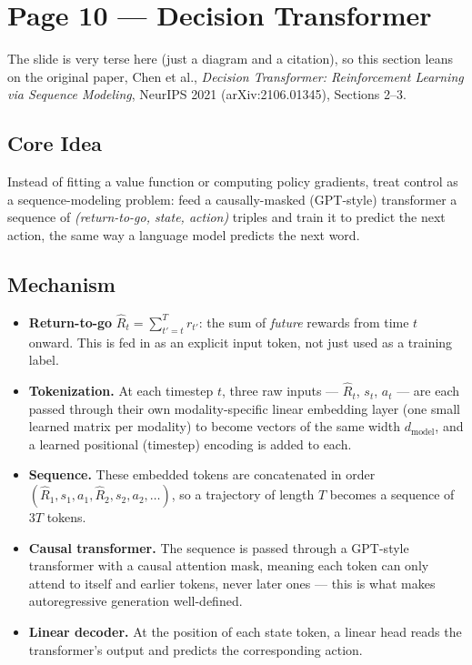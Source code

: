 \documentclass[11pt]{article}
\begin{document}
\section*{Page 10 --- Decision Transformer}

The slide is very terse here (just a diagram and a citation), so this section leans on the original paper, Chen et al., \emph{Decision Transformer: Reinforcement Learning via Sequence Modeling}, NeurIPS 2021 (arXiv:2106.01345), Sections 2--3.

\subsection*{Core Idea}

Instead of fitting a value function or computing policy gradients, treat control as a sequence-modeling problem: feed a causally-masked (GPT-style) transformer a sequence of \emph{(return-to-go, state, action)} triples and train it to predict the next action, the same way a language model predicts the next word.

\subsection*{Mechanism}

\begin{itemize}
\item \textbf{Return-to-go} $\hat R_t = \sum_{t'=t}^{T} r_{t'}$: the sum of \emph{future} rewards from time $t$ onward. This is fed in as an explicit input token, not just used as a training label.
\item \textbf{Tokenization.} At each timestep $t$, three raw inputs --- $\hat R_t$, $s_t$, $a_t$ --- are each passed through their own modality-specific linear embedding layer (one small learned matrix per modality) to become vectors of the same width $d_{\text{model}}$, and a learned positional (timestep) encoding is added to each.
\item \textbf{Sequence.} These embedded tokens are concatenated in order $(\hat R_1, s_1, a_1, \hat R_2, s_2, a_2, \dots)$, so a trajectory of length $T$ becomes a sequence of $3T$ tokens.
\item \textbf{Causal transformer.} The sequence is passed through a GPT-style transformer with a causal attention mask, meaning each token can only attend to itself and earlier tokens, never later ones --- this is what makes autoregressive generation well-defined.
\item \textbf{Linear decoder.} At the position of each state token, a linear head reads the transformer's output and predicts the corresponding action.
\end{itemize}
\end{document}
